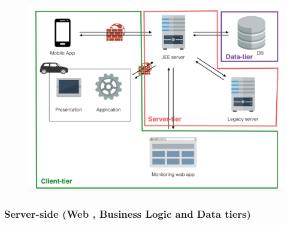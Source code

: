 \documentclass[]{article}
\begin{document}
\begin{figure}[htbp]
\centering
\includegraphics[width=1.00000\textwidth,height=1.00000\textwidth]{./images/sysApp.png}
\caption{}\label{id}
\end{figure}

\subsubsection{Server-side (Web , Business Logic and Data
tiers)}\label{server-side-web-business-logic-and-data-tiers}
\end{document}
